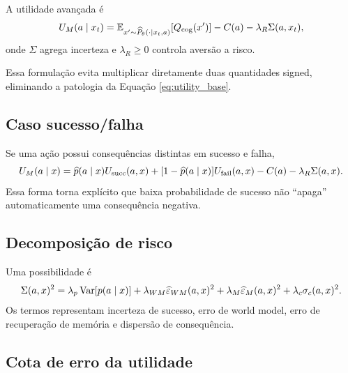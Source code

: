 A utilidade avançada é
\begin{equation}
U_M(a\mid x_t)=
\operatorname{\mathbb{E}}_{x'\sim \widehat P_\theta(\cdot\mid x_t,a)}
[Q_{\rm cog}(x')]
-C(a)-\lambda_R\Sigma(a,x_t),
\label{eq:utility_advanced}
\end{equation}
onde \(\Sigma\) agrega incerteza e \(\lambda_R\ge0\) controla aversão a risco.

Essa formulação evita multiplicar diretamente duas quantidades signed, eliminando a patologia da Equação \eqref{eq:utility_base}.

\subsection{Caso sucesso/falha}

Se uma ação possui consequências distintas em sucesso e falha,
\begin{equation}
U_M(a\mid x)=
\widehat p(a\mid x)U_{\rm succ}(a,x)
+[1-\widehat p(a\mid x)]U_{\rm fail}(a,x)
-C(a)-\lambda_R\Sigma(a,x).
\label{eq:success_failure_utility}
\end{equation}
Essa forma torna explícito que baixa probabilidade de sucesso não ``apaga'' automaticamente uma consequência negativa.

\subsection{Decomposição de risco}

Uma possibilidade é
\begin{equation}
\Sigma(a,x)^2=
\lambda_p\operatorname{Var}[p(a\mid x)]
+\lambda_{WM}\widehat\varepsilon_{WM}(a,x)^2
+\lambda_M\widehat\varepsilon_M(a,x)^2
+\lambda_c\sigma_c(a,x)^2.
\end{equation}
Os termos representam incerteza de sucesso, erro de world model, erro de recuperação de memória e dispersão de consequência.

\subsection{Cota de erro da utilidade}

